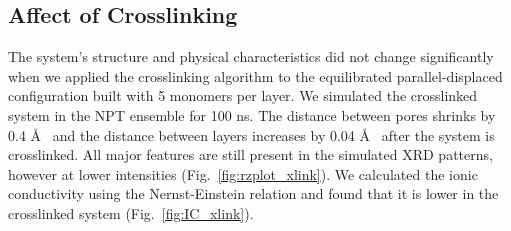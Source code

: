 \documentclass{article}
\newcommand{\angstrom}{\textup{\AA}}
\begin{document}
  \subsection{Affect of Crosslinking}\label{section:xlink}

  The system's structure and physical characteristics did not change
  significantly when we applied the crosslinking algorithm to the equilibrated
  parallel-displaced configuration built with 5 monomers per layer. We simulated
  the crosslinked system in the NPT ensemble for 100 ns. The distance between
  pores shrinks by 0.4 \angstrom~ and the distance between layers increases by
  0.04 \AA~ after the system is crosslinked. All major features are still present
  in the simulated XRD patterns, however at lower intensities
  (Fig.~\ref{fig:rzplot_xlink}). We calculated the ionic conductivity using the
  Nernst-Einstein relation and found that it is lower in the crosslinked system
  (Fig.~\ref{fig:IC_xlink}).
\end{document}

